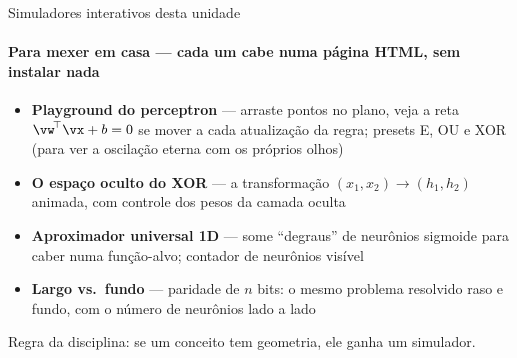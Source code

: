 \documentclass[aspectratio=169, 11pt]{beamer}
\begin{document}
\begin{frame}{Simuladores interativos desta unidade}
  \framesubtitle{Para mexer em casa — cada um cabe numa página HTML, sem instalar nada}

  \begin{itemize}\setlength{\itemsep}{0.4ex}
    \item {\color{icCiano}\textbf{Playground do perceptron}} — arraste pontos
          no plano, veja a reta $\vw^{\!\top}\vx + b = 0$ se mover a cada
          atualização da regra; presets E, OU e XOR (para ver a oscilação
          eterna com os próprios olhos)
    \item {\color{icAzulClaro}\textbf{O espaço oculto do XOR}} — a
          transformação $(x_1,x_2) \to (h_1,h_2)$ animada, com controle dos
          pesos da camada oculta
    \item {\color{icAzul}\textbf{Aproximador universal 1D}} — some ``degraus''
          de neurônios sigmoide para caber numa função-alvo; contador de
          neurônios visível
    \item {\color{icMagenta}\textbf{Largo vs.\ fundo}} — paridade de $n$ bits:
          o mesmo problema resolvido raso e fundo, com o número de neurônios
          lado a lado
  \end{itemize}

  \begin{ideiabox}
    Regra da disciplina: se um conceito tem geometria, ele ganha um simulador.
  \end{ideiabox}
\end{frame}
\end{document}
